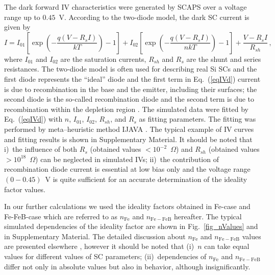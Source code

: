 \documentclass[num-refs]{wiley-article} %
\begin{document}
The dark forward IV characteristics were generated by SCAPS over a voltage range up to $0.45$~V.
According to the two-diode model, the dark SC current is given by \citep{Breitenstein2013}
\begin{equation}
\label{eqIVd}
    I=I_{01}\left[\exp\left(-\frac{q(V-R_sI)}{kT}\right)-1\right]
      + I_{02}\left[\exp\left(-\frac{q(V-R_sI)}{nkT}\right)-1\right]
      +\frac{V-R_sI}{R_{sh}}\,,
\end{equation}
where
$I_{01}$ and $I_{02}$ are the saturation currents,
$R_{sh}$ and $R_s$ are the shunt and series resistances.
The two-diode model is often used for describing real Si SCs
and the first diode represents the ``ideal'' diode and
the first term in Eq.~(\ref{eqIVd})
current is due to recombination in the base
and the emitter, including their surfaces;
the second diode is the so-called recombination diode
and the second term is due to recombination within
the depletion region \citep{Breitenstein2013}.
The simulated data were fitted by Eq.~(\ref{eqIVd})
with $n$, $I_{01}$, $I_{02}$,
$R_{sh}$, and $R_s$ as fitting parameters.
The fitting was performed by meta--heuristic method IJAVA \cite{IJAVA}.
The typical example of IV curves and fitting results is shown
in Supplementary Material.
It should be noted that
i)~the influence of both $R_s$ (obtained values $<10^{-2}$~$\Omega$) and $R_{sh}$
(obtained values $>10^{18}$~$\Omega$) can be neglected in simulated IVs;
ii)~the contribution of recombination diode current is essential at low bias only
and the voltage range $(0-0.45)$~V is quite sufficient for an accurate determination of the ideality factor values.

In our further calculations we used the ideality factors
obtained in  Fe-case and Fe-FeB-case
which are referred to as  $n_\mathrm{Fe}$ and $n_\mathrm{Fe-FeB}$ hereafter.
The typical simulated dependencies of  the ideality factor are shown in Fig.~\ref{fig_nValues}
and in Supplementary Material.
The detailed discussion about $n_\mathrm{Fe}$ and $n_\mathrm{Fe-FeB}$ values are presented elsewhere \cite{OlikhJPS},
however it should be noted that
(i)~$n$ can take equal values for different  values of SC parameters;
(ii)~dependencies of $n_\mathrm{Fe}$ and $n_\mathrm{Fe-FeB}$ differ not only in absolute values but also in behavior, although insignificantly.
\end{document}

